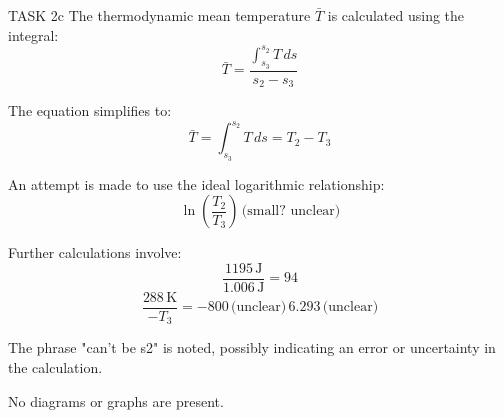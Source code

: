 TASK 2c  
The thermodynamic mean temperature \( \bar{T} \) is calculated using the integral:  
\[
\bar{T} = \frac{\int_{s_3}^{s_2} T \, ds}{s_2 - s_3}
\]  

The equation simplifies to:  
\[
\bar{T} = \int_{s_3}^{s_2} T \, ds = T_2 - T_3
\]  

An attempt is made to use the ideal logarithmic relationship:  
\[
\ln\left(\frac{T_2}{T_3}\right) \, \text{(small? unclear)}
\]  

Further calculations involve:  
\[
\frac{1195 \, \text{J}}{1.006 \, \text{J}} = 94
\]  
\[
\frac{288 \, \text{K}}{-T_3} = -800 \, \text{(unclear)} \, 6.293 \, \text{(unclear)}
\]  

The phrase "can't be s2" is noted, possibly indicating an error or uncertainty in the calculation.  

No diagrams or graphs are present.
